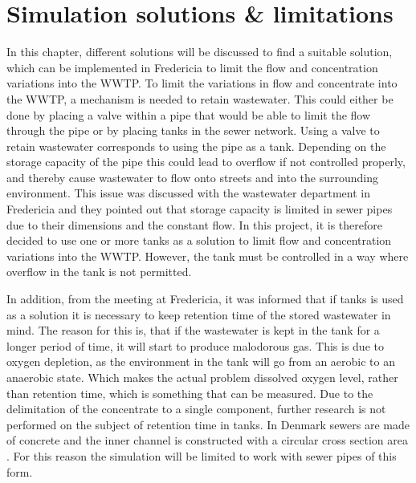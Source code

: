 
\chapter{Simulation solutions \& limitations }\label{ch:simulation_solution_and_limitation}
In this chapter, different solutions will be discussed to find a suitable solution, which can be implemented in Fredericia to limit the flow and concentration variations into the WWTP.
To limit the variations in flow and concentrate into the WWTP, a mechanism is needed to retain wastewater. This could either be done by placing a valve within a pipe that would be able to limit the flow through the pipe or by placing tanks in the sewer network.%
Using a valve to retain wastewater corresponds to using the pipe as a tank. Depending on the storage capacity of the pipe this could lead to overflow if not controlled properly, and thereby cause wastewater to flow onto streets and into the surrounding environment. %
This issue was discussed with the wastewater department in Fredericia and they pointed out that storage capacity is limited in sewer pipes due to their dimensions and the constant flow. 
In this project, it is therefore decided to use one or more tanks as a solution to limit flow and concentration variations into the WWTP. %
However, the tank must be controlled in a way where overflow in the tank is not permitted. %

In addition, from the meeting at Fredericia, it was informed that if tanks is used as a solution it is necessary to keep retention time of the stored wastewater in mind. The reason for this is, that if the wastewater is kept in the tank for a longer period of time, it will start to produce malodorous gas. This is due to oxygen depletion, as the environment in the tank will go from an aerobic to an anaerobic state. Which makes the actual problem dissolved oxygen level, rather than retention time, which is something that can be measured. Due to the delimitation of the concentrate to a single component, further research is not performed on the subject of retention time in tanks.
In Denmark sewers are made of concrete and the inner channel is constructed with a circular cross section area \cite{betonhaandbogen}. For this reason the simulation will be limited to work with sewer pipes of this form.



